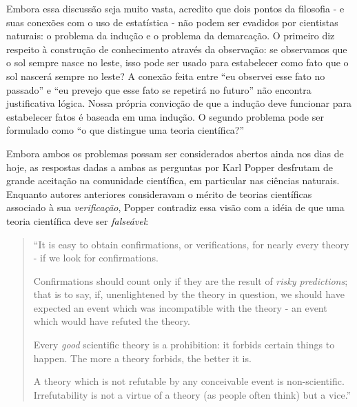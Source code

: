 Embora essa discussão seja muito vasta, acredito que dois pontos da filosofia - e suas conexões com o uso de estatística -
não podem ser evadidos por cientistas naturais: o problema da indução e o problema da demarcação.
O primeiro diz respeito à construção de conhecimento através da observação: se observamos que o sol sempre nasce no leste,
isso pode ser usado para estabelecer como fato que o sol nascerá sempre no leste? A conexão feita entre ``eu observei esse
fato no passado'' e ``eu prevejo que esse fato se repetirá no futuro'' não encontra justificativa lógica. Nossa própria convicção
de que a indução deve funcionar para estabelecer fatos é baseada em uma indução. O segundo problema pode ser formulado como
``o que distingue uma teoria científica?'' %

Embora ambos os problemas possam ser considerados abertos ainda nos dias de hoje,
as respostas dadas a ambas as perguntas por Karl Popper desfrutam de grande aceitação na comunidade científica, em particular
nas ciências naturais. 
Enquanto autores anteriores consideravam o mérito de teorias científicas associado à sua {\em verificação}, Popper
contradiz essa visão com a idéia de que uma teoria científica deve ser {\em falseável}:

\begin{quote}
``It is easy to obtain confirmations, or verifications, for nearly every theory - if we look for confirmations.

Confirmations should count only if they are the result of {\em risky predictions}; that is to say, if, unenlightened by 
the theory in question, we should have expected an event which was incompatible with the theory - an 
event which would have refuted the theory.

Every {\em good} scientific theory is a prohibition: it forbids certain things to happen. The more a theory forbids, the 
better it is.

A theory which is not refutable by any conceivable event is non-scientific. Irrefutability is not a virtue of a 
theory (as people often think) but a vice.'' \citep{Popper63}
\end{quote}

